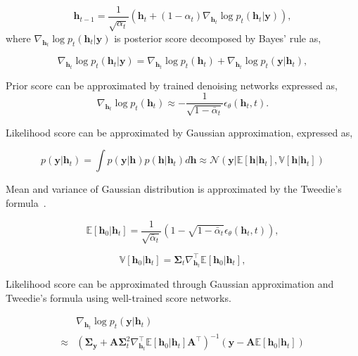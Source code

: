 \documentclass[lettersize,journal]{IEEEtran}
\begin{document}
\begin{equation}
\mathbf{h}_{t-1} = \frac{1}{\sqrt{ \alpha_{t} }}(\mathbf{h}_{t}+(1-\alpha_{t})\nabla_{\mathbf{h}_{t}}\log p_{t}(\mathbf{h}_{t}|\mathbf{y})),
\end{equation}
where $\nabla_{\mathbf{h}_{t}}\log p_{t}(\mathbf{h}_{t}|\mathbf{y})$ is posterior score decomposed by Bayes' rule as,

\begin{equation}
\nabla_{\mathbf{h}_{t}}\log p_{t}(\mathbf{h}_{t}|\mathbf{y}) = \nabla_{\mathbf{h}_{t}}\log p_{t}(\mathbf{h}_{t})+\nabla_{\mathbf{h}_{t}}\log p_{t}(\mathbf{y}|\mathbf{h}_{t}),
\end{equation}

Prior score can be approximated by trained denoising networks expressed as,
\begin{equation}
\nabla_{\mathbf{h}_{t}}\log p_{t}(\mathbf{h}_{t})\approx -\frac{1}{\sqrt{ 1-\bar{\alpha}_{t} }}\epsilon_{\theta}(\mathbf{h}_{t},t).
\end{equation}

Likelihood score can be approximated by Gaussian approximation, expressed as,

\begin{equation}
p(\mathbf{y}|\mathbf{h}_{t}) = \int p(\mathbf{y}|\mathbf{h})p(\mathbf{h}|\mathbf{h}_{t})d\mathbf{h} \approx\mathcal{N}(\mathbf{y}|\mathbb{E}[\mathbf{h}|\mathbf{h}_{t}], \mathbb{V}[\mathbf{h}|\mathbf{h}_{t}])
\end{equation}

Mean and variance of Gaussian distribution is approximated by the Tweedie’s formula~\cite{efronTweediesFormulaSelection2011}.

\begin{equation}
\mathbb{E}[\mathbf{h}_{0}|\mathbf{h}_{t}] = \frac{1}{\sqrt{ \bar{\alpha}_{t} }}(1-\sqrt{ 1-\bar{\alpha}_{t} }\epsilon_{\theta}(\mathbf{h}_{t},t)),
\end{equation}

\begin{equation}
\mathbb{V}[\mathbf{h}_{0}|\mathbf{h}_{t}] = \boldsymbol{\Sigma}_{t}\nabla_{\mathbf{h}_{t}}^{\top}\mathbb{E}[\mathbf{h}_{0}|\mathbf{h}_{t}],
\end{equation}

Likelihood score can be approximated through Gaussian approximation and Tweedie's formula using well-trained score networks.

\begin{equation}
\begin{aligned}
& \nabla_{\mathbf{h}_{t}}\log p_{t}(\mathbf{y}|\mathbf{h}_{t})\\
\approx & (\boldsymbol{\Sigma}_{\mathbf{y}} + \mathbf{A}\boldsymbol{\Sigma}_{t}^{2}\nabla_{\mathbf{h}_{t}}^{\top}\mathbb{E}[\mathbf{h}_{0}|\mathbf{h}_{t}]\mathbf{A}^{\top})^{-1}(\mathbf{y}-\mathbf{A}\mathbb{E}[\mathbf{h}_{0}|\mathbf{h}_{t}])
\end{aligned}
\end{equation}
\end{document}
